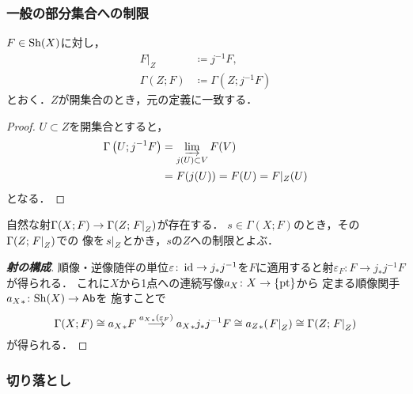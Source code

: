 \subsubsection*{一般の部分集合への制限}
\(F\in\Sh(X)\)に対し，
\begin{align}
    F\rvert_Z&\coloneqq j^{-1}F,\\
    \Gamma(Z;F)&\coloneqq\Gamma\left(Z;j^{-1}F\right)    
\end{align}
とおく．\(Z\)が開集合のとき，元の定義に一致する．
\begin{proof}
    \(U\subset Z\)を開集合とすると，
    \begin{align*}
        \Gamma\left(U;j^{-1}F\right)
        &=\indlim[j(U)\subset V]F(V)\\
        &=F(j(U))=F(U)=F\rvert_Z(U)
    \end{align*}
    となる．
\end{proof}

自然な射\(\Gamma(X;F)\to\Gamma(Z;\mres[F]{Z})\)が存在する．
\(s\in\Gamma(X;F)\)のとき，その\(\Gamma(Z;\mres[F]{Z})\)での
像を\(\mres[s]{Z}\)とかき，\(s\)の\(Z\)への制限とよぶ．
\begin{proof}[\textbf{射の構成}]
    順像・逆像随伴の単位\(
        \varepsilon\colon\id\to j_{\ast}j^{-1}
    \)を\(F\)に適用すると射\(
        \varepsilon_F\colon F\to j_{\ast}j^{-1}F
    \)が得られる．
    これに\(X\)から1点への連続写像\(a_X\colon X\to\{\pt\}\)から
    定まる順像関手\({a_X}_{\ast}\colon \Sh(X)\to\cAb\)を
    施すことで
    \[
        \Gamma(X;F)\cong {a_X}_{\ast}F
        \overset{{a_X}_{\ast}(\varepsilon_F)}{\longrightarrow} {a_X}_{\ast}j_{\ast}j^{-1}F
        \cong {a_Z}_{\ast}(\mres[F]{Z})
        \cong\Gamma(Z;\mres[F]{Z})
    \]
    が得られる．
\end{proof}

\subsubsection*{切り落とし}
